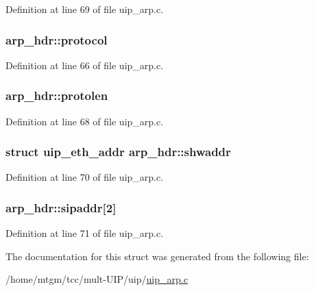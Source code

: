 Definition at line 69 of file uip\_\-arp.c.

\hypertarget{structarp__hdr_a17beac5fa18c23cef832a42772545023}{
\subsubsection[{protocol}]{ {\bf arp\_\-hdr::protocol}}}
\label{structarp__hdr_a17beac5fa18c23cef832a42772545023}


Definition at line 66 of file uip\_\-arp.c.

\hypertarget{structarp__hdr_a9e6708eb1418ec6d1bddd6478ff3878c}{
\subsubsection[{protolen}]{ {\bf arp\_\-hdr::protolen}}}
\label{structarp__hdr_a9e6708eb1418ec6d1bddd6478ff3878c}


Definition at line 68 of file uip\_\-arp.c.

\hypertarget{structarp__hdr_a62e5377ce37cd7a2826bbb3866a340bb}{
\subsubsection[{shwaddr}]{\setlength{\rightskip}{0pt plus 5cm}struct {\bf uip\_\-eth\_\-addr} {\bf arp\_\-hdr::shwaddr}}}
\label{structarp__hdr_a62e5377ce37cd7a2826bbb3866a340bb}


Definition at line 70 of file uip\_\-arp.c.

\hypertarget{structarp__hdr_a337c5b1cbd423f7d1a7a0420ced5e029}{
\subsubsection[{sipaddr}]{ {\bf arp\_\-hdr::sipaddr}\mbox{[}2\mbox{]}}}
\label{structarp__hdr_a337c5b1cbd423f7d1a7a0420ced5e029}


Definition at line 71 of file uip\_\-arp.c.



The documentation for this struct was generated from the following file:\begin{DoxyCompactItemize}
\item 
/home/mtgm/tcc/mult-\/UIP/uip/\hyperlink{uip__arp_8c}{uip\_\-arp.c}\end{DoxyCompactItemize}
